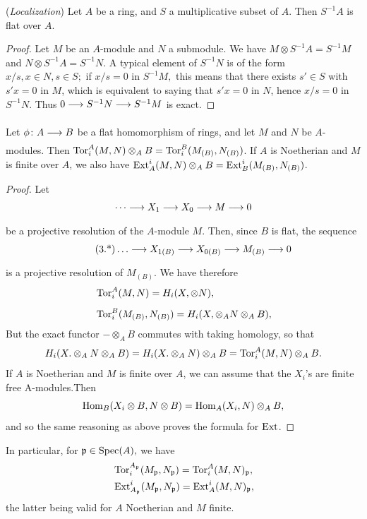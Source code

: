 \documentclass[../main]{subfiles}
\begin{document}
\newparagraph (\emph{Localization}) Let $A$ be a ring, and $S$ a multiplicative subset of $A$. Then $S^{-1}A$ is flat over $A$. 

\begin{proof} 
    Let $M$ be an $A$-module and $N$ a submodule. We have $M \otimes S^{-1}A = S^{-1}M$ and $N \otimes S^{-1}A = S^{-1}N.$ A typical element of $S^{-1}N$ is of the form $x/s, x\in N, s \in S;$ if $x/s = 0$ in $S^{-1}M,$ this means that there exists $s' \in S$ with $s'x = 0$ in $M$, which is equivalent to saying that $s'x = 0$ in $N$, hence $x/s =0$ in $S^{-1}N.$ Thus $0 \varrightarrow{} S^{-1}N \varrightarrow{} S^{-1}M$ is exact.
\end{proof}

\newparagraph Let $\phi\colon A \varrightarrow{} B  $ be a flat homomorphism of rings, and let $M$ and $N$ be $A$-modules. Then $\operatorname{Tor}_i^A(M,N) \otimes_A B = \operatorname{Tor}_i^B (M_{(B)}, N_{(B)}) $. If $A$ is Noetherian and $M$ is finite over $A$, we also have $\operatorname{Ext}_A^i(M,N) \otimes_AB = \operatorname{Ext}_B^i(M_{(B)}, N_{(B)}) $. 


\begin{proof} 
    Let \[\cdots \varrightarrow{} X_1 \varrightarrow{} X_0 \varrightarrow{} M \varrightarrow{} 0\] be a projective resolution of the $A$-module $M$. Then, since $B$ is flat, the sequence
     \[\tag{3.*}\label{eqn:3.*}
        \ldots \varrightarrow{} X_{1(B)} \varrightarrow{} X_{0(B)} \varrightarrow{} M_{(B)} \varrightarrow{} 0
    \]
    is a projective resolution of $M_{(B)}$. We have therefore 
    \begin{align*}
        &\operatorname{Tor}_i^A(M,N) = H_i(X,\otimes N),\\[0.5em]
        &\operatorname{Tor}_i^B(M_{(B)}, N_{(B)}) = H_i(X, \otimes_A N \otimes_A B),
    \end{align*}
    But the exact functor $-\otimes_AB$ commutes with taking homology, so that 
    \[
        H_i(X.\otimes_AN\otimes_A B) = H_i(X.\otimes_AN)\otimes_A B = \operatorname{Tor}_i^A (M,N) \otimes_AB.
    \] 
    If $A$ is Noetherian and $M$ is finite over $A$, we can assume that the $X_i$'s are finite free A-modules.Then \[\operatorname{Hom}_B(X_i\otimes B, N \otimes B) = \operatorname{Hom}_A(X_i, N) \otimes_A B,\] and so the same reasoning as above proves the formula for $\operatorname{Ext}$. 
\end{proof}
In particular, for $\mathfrak{p} \in \operatorname{Spec}(A),$ we have 
\begin{align*}
    &\operatorname{Tor}_i^{A_{\mathfrak{p}}} (M_{\mathfrak{p}}, N_{\mathfrak{p}}) = \operatorname{Tor}_i^A (M,N)_{\mathfrak{p}}, \\
    &\operatorname{Ext}^i_{A_{\mathfrak{p}}} (M_{\mathfrak{p}}, N_{\mathfrak{p}}) =\operatorname{Ext}^i_A (M,N)_{\mathfrak{p}}, 
\end{align*}
the latter being valid for $A$ Noetherian and $M$ finite.
\end{document}
